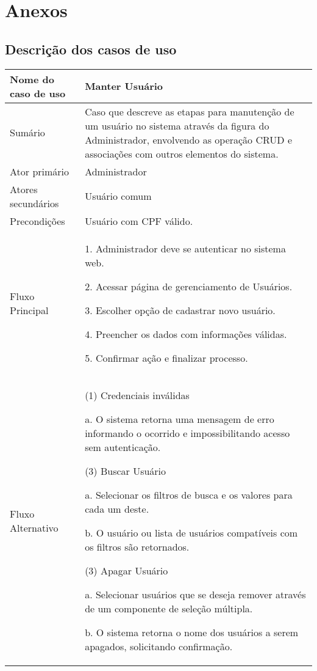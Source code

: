 \appendix
\chapter{Anexos}
\label{cap:anexos}

\section{Descrição dos casos de uso}

\begin{flushleft}
\tablefirsthead{}
\tablehead{}
\tabletail{}
\tablelasttail{}
\begin{supertabular}{|m{5.5680003cm}|m{9.325cm}|}
\hline
Nome do caso de uso &
Manter Usuário\\\hline
Sumário &
Caso que descreve as etapas para manutenção de um usuário no sistema através da figura do Administrador, envolvendo as operação CRUD e associações com outros elementos do sistema.\\\hline
Ator primário &
Administrador\\\hline
Atores secundários &
Usuário comum\\\hline
Precondições &
Usuário com CPF válido.\\\hline
Fluxo Principal &
1. Administrador deve se autenticar no sistema web.

2. Acessar página de gerenciamento de Usuários.

3. Escolher opção de cadastrar novo usuário.

4. Preencher os dados com informações válidas.

5. Confirmar ação e finalizar processo.\\\hline
Fluxo Alternativo &
(1) Credenciais inválidas

a. O sistema retorna uma mensagem de erro informando o ocorrido e impossibilitando acesso sem autenticação.

(3) Buscar Usuário

a. Selecionar os filtros de busca e os valores para cada um deste.

b. O usuário ou lista de usuários compatíveis com os filtros são retornados.

(3) Apagar Usuário

a. Selecionar usuários que se deseja remover através de um componente de seleção múltipla.

b. O sistema retorna o nome dos usuários a serem apagados, solicitando confirmação.


\end{supertabular}
\end{flushleft}

